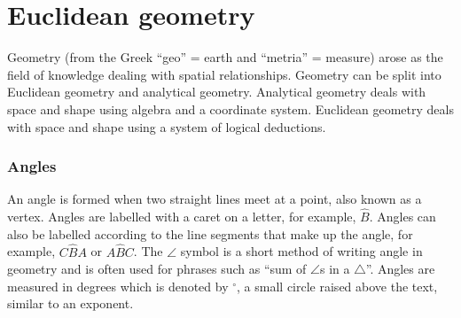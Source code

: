 \chapter{Euclidean geometry}
\setcounter{figure}{1}
\setcounter{subfigure}{1}

Geometry (from the Greek ``geo'' = earth and ``metria'' = measure) arose as the field of knowledge
dealing with spatial relationships. Geometry can be split into Euclidean geometry and analytical geometry. 
Analytical geometry deals with space and shape using algebra and a coordinate system. 
Euclidean geometry deals with space and shape using a system of logical deductions.\par 


\subsection*{Angles}
An angle is formed when two straight lines meet at a point, also known as a vertex. 
Angles are labelled with a caret on a letter, for example, $\hat{B}$.
Angles can also be labelled according to the line segments that make up the
angle, for example, $C\hat{B}A$ or $A\hat{B}C$. 
The $\angle $ symbol is a short method of writing angle in
geometry and is often used for phrases such as ``sum of $\angle$s in a $\triangle$''.
Angles are measured in degrees which is denoted by $^{\circ }$, a small circle
raised above the text, similar to an exponent.\par 



